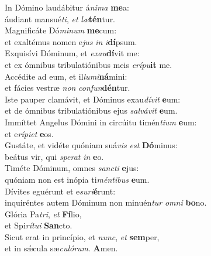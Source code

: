 \evenverse In Dómino laudábitur á\textit{ni}\textit{ma} \textbf{me}a:~\*\\
\evenverse áudiant mansué\textit{ti}, \textit{et} \textit{læ}\textbf{tén}tur.\\
\oddverse Magnificáte Dó\textit{mi}\textit{num} \textbf{me}cum:~\*\\
\oddverse et exaltémus nomen e\textit{jus} \textit{in} \textit{i}\textbf{dí}psum.\\
\evenverse Exquisívi Dóminum, et \textit{e}\textit{xau}\textbf{dí}vit me:~\*\\
\evenverse et ex ómnibus tribulatiónibus meis \textit{e}\textit{rí}\textit{pu}\textbf{it} me.\\
\oddverse Accédite ad eum, et il\textit{lu}\textit{mi}\textbf{ná}mini:~\*\\
\oddverse et fácies vestræ \textit{non} \textit{con}\textit{fun}\textbf{dén}tur.\\
\evenverse Iste pauper clamávit, et Dóminus exau\textit{dí}\textit{vit} \textbf{e}um:~\*\\
\evenverse et de ómnibus tribulatiónibus ejus \textit{sal}\textit{vá}\textit{vit} \textbf{e}um.\\
\oddverse Immíttet Angelus Dómini in circúitu timén\textit{ti}\textit{um} \textbf{e}um:~\*\\
\oddverse et e\textit{rí}\textit{pi}\textit{et} \textbf{e}os.\\
\evenverse Gustáte, et vidéte quóniam suá\textit{vis} \textit{est} \textbf{Dó}minus:~\*\\
\evenverse beátus vir, qui \textit{spe}\textit{rat} \textit{in} \textbf{e}o.\\
\oddverse Timéte Dóminum, omnes \textit{san}\textit{cti} \textbf{e}jus:~\*\\
\oddverse quóniam non est inópia ti\textit{mén}\textit{ti}\textit{bus} \textbf{e}um.\\
\evenverse Dívites eguérunt et e\textit{su}\textit{ri}\textbf{é}runt:~\*\\
\evenverse inquiréntes autem Dóminum non minuén\textit{tur} \textit{om}\textit{ni} \textbf{bo}no.\\
\oddverse Glória Pa\textit{tri}, \textit{et} \textbf{Fí}lio,~\*\\
\oddverse et Spi\textit{rí}\textit{tu}\textit{i} \textbf{San}cto.\\
\evenverse Sicut erat in princípio, et \textit{nunc}, \textit{et} \textbf{sem}per,~\*\\
\evenverse et in sǽcula sæ\textit{cu}\textit{ló}\textit{rum}. \textbf{A}men.\\
